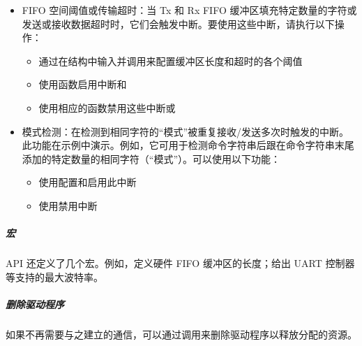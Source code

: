 \documentclass[a4paper,12pt,english]{sphinxmanual}
\begin{document}
{{\begin{itemize}
\item {} 
\sphinxAtStartPar
FIFO 空间阈值或传输超时：当 Tx 和 Rx FIFO 缓冲区填充特定数量的字符或发送或接收数据超时时，它们会触发中断。要使用这些中断，请执行以下操作：
\begin{itemize}
\item {} 
\sphinxAtStartPar
{}通过在结构中输入并调用来配置缓冲区长度和超时的各个阈值

\item {} 
\sphinxAtStartPar
使用函数启用中断和

\item {} 
\sphinxAtStartPar
使用相应的函数禁用这些中断或

\end{itemize}

\item {} 
\sphinxAtStartPar
模式检测：在检测到相同字符的“模式”被重复接收/发送多次时触发的中断。此功能在示例中演示。例如，它可用于检测命令字符串后跟在命令字符串末尾添加的特定数量的相同字符（“模式”）。可以使用以下功能：
\begin{itemize}
\item {} 
\sphinxAtStartPar
使用配置和启用此中断

\item {} 
\sphinxAtStartPar
使用禁用中断

\end{itemize}

\end{itemize}


\subparagraph{宏}
\label{\detokenize{exp-esp32/peripherals/uart:id11}}
\sphinxAtStartPar
API 还定义了几个宏。例如，定义硬件 FIFO 缓冲区的长度；给出 UART 控制器等支持的最大波特率。


\subparagraph{删除驱动程序}
\label{\detokenize{exp-esp32/peripherals/uart:id12}}
\sphinxAtStartPar
{}如果不再需要与之建立的通信，可以通过调用来删除驱动程序以释放分配的资源。


}}
\end{document}
